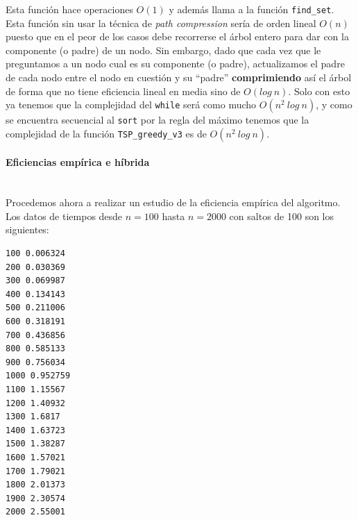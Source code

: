 \documentclass{article}
\newcommand{\myparagraph}[1]{\paragraph{#1}\mbox{}\\}
\begin{document}
 Esta función hace operaciones $O(1)$ y además llama a la función \verb|find_set|. Esta función sin usar la técnica de \textit{path compression} sería de orden lineal $O(n)$ puesto que en el peor de los casos debe recorrerse el 
árbol entero para dar con la componente (o padre) de un nodo. Sin embargo, dado que cada vez que le preguntamos a un nodo cual es su componente (o padre), actualizamos el padre de cada nodo entre el nodo en cuestión y su ``padre'' \textbf{comprimiendo} así el árbol de forma que no tiene eficiencia lineal en media sino de $O(log\:n)$. Solo con esto ya tenemos que la complejidad del \verb|while| será como mucho $O(n^{2}\:log\:n)$, y como se encuentra secuencial al \verb|sort| por la regla del máximo tenemos que la complejidad de la función \verb|TSP_greedy_v3| es de $O(n^{2}\:log\:n)$.

\myparagraph{Eficiencias empírica e híbrida}
Procedemos ahora a realizar un estudio de la eficiencia 
empírica del algoritmo. Los datos de tiempos desde $n=100$ hasta $n=2000$ con saltos de 100 son los siguientes:
\begin{verbatim}
100 0.006324
200 0.030369
300 0.069987
400 0.134143
500 0.211006
600 0.318191
700 0.436856
800 0.585133
900 0.756034
1000 0.952759
1100 1.15567
1200 1.40932
1300 1.6817
1400 1.63723
1500 1.38287
1600 1.57021
1700 1.79021
1800 2.01373
1900 2.30574
2000 2.55001
\end{verbatim}
\end{document}
